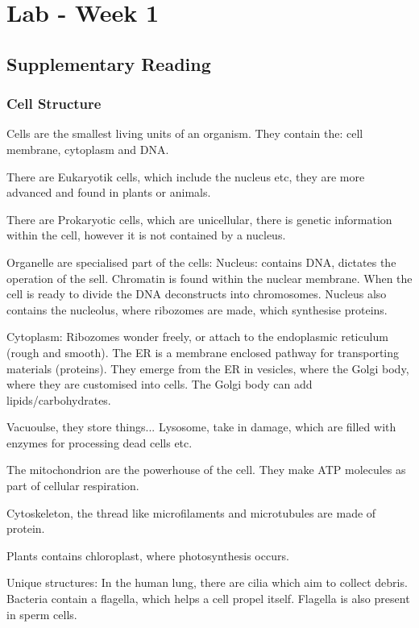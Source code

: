 \section{Lab - Week 1}

\subsection{Supplementary Reading}

\subsubsection{Cell Structure}
Cells are the smallest living units of an organism. They contain the: cell membrane, cytoplasm and DNA. 

There are Eukaryotik cells, which include the nucleus etc, they are more advanced and found in plants or animals. 

There are Prokaryotic cells, which are unicellular, there is genetic information within the cell, however it is not contained by a nucleus.

Organelle are specialised part of the cells:
Nucleus: contains DNA, dictates the operation of the sell. Chromatin is found within the nuclear membrane. When the cell is ready to divide the DNA deconstructs into chromosomes. Nucleus also contains the nucleolus, where ribozomes are made, which synthesise proteins. 

Cytoplasm: Ribozomes wonder freely, or attach to the endoplasmic reticulum (rough and smooth). The ER is a membrane enclosed pathway for transporting materials (proteins). They emerge from the ER in vesicles, where the Golgi body, where they are customised into cells. The Golgi body can add lipids/carbohydrates.

Vacuoulse, they store things... Lysosome, take in damage, which are filled with enzymes for processing dead cells etc.

The mitochondrion are the powerhouse of the cell. They make ATP molecules as part of cellular respiration. 

Cytoskeleton, the thread like microfilaments and microtubules are made of protein. 

Plants contains chloroplast, where photosynthesis occurs.

Unique structures: In the human lung, there are cilia which aim to collect debris. Bacteria contain a flagella, which helps a cell propel itself. Flagella is also present in sperm cells. 

